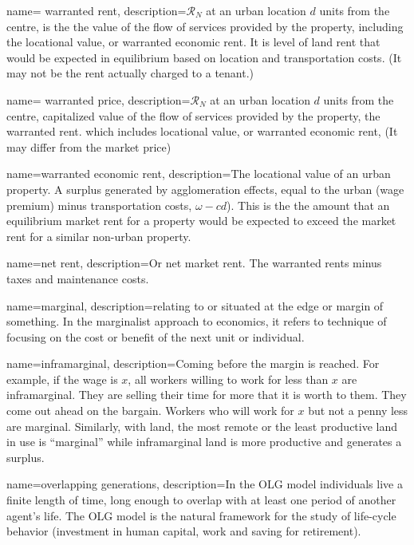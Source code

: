 {
name= warranted rent,
description={$\mathcal{R}_N$ at an  urban location  $d$ units from the centre, is the the value of the flow of services provided by the property, including the locational value, or \gls{warranted economic rent}. It is level of land rent that would be expected in equilibrium based on location and transportation costs.  (It may not be the rent actually charged to a tenant.) }
}

{
name= warranted price,
description={$\mathcal{R}_N$ at an  urban location  $d$ units from the centre, capitalized value of the flow of services provided by the property, the \gls{warranted rent}. 
which  includes locational value, or \gls{warranted economic rent}, (It may differ from the market price) }}

{
name=warranted economic rent,
description={The locational value of an urban property. A surplus generated by \glspl{agglomeration effect}, equal to the urban (wage premium) minus transportation costs, $\omega-{c} d$). This is the the amount that an equilibrium market rent for a property would be expected to exceed the market rent for a similar non-urban property.}
}

{
name=net rent,
description={Or net market rent. The warranted rents minus taxes and maintenance costs.}
}



{
name=marginal,
description={relating to or situated at the edge or margin of something. In the marginalist approach to economics, it  refers to technique of focusing on the cost or benefit of the next unit or individual.}
}

{
name=inframarginal,
description={Coming before the margin is reached. For example, if the wage is $x$, all workers willing to work for less than $x$ are inframarginal. They are selling their time for more that it is worth to them. They come out ahead on the bargain. Workers who will work for $x$ but not a penny less are marginal. Similarly, with land, the most remote or the least productive land in use is ``marginal'' while  inframarginal land is more productive and generates a \gls{surplus}.}
}

{
name=overlapping generations,
description={In the \gls{OLG} model individuals live a finite length of time, long enough to overlap with at least one period of another agent's life. The OLG model is the natural framework for the study of life-cycle behavior (investment in human capital, work and saving for retirement).}
}

